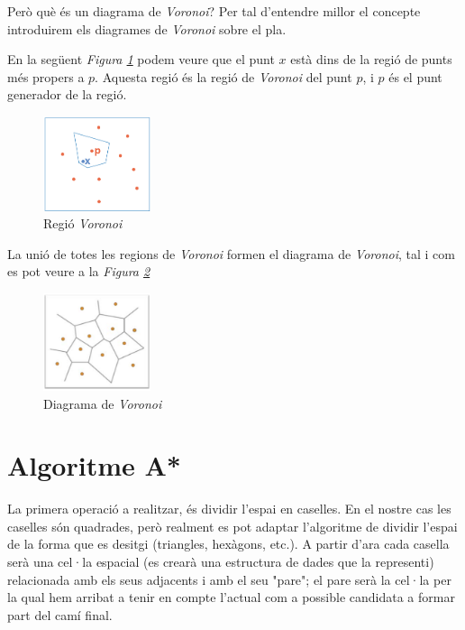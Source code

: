 \documentclass[12pt]{article}
\begin{document}
Però què és un diagrama de \textit{Voronoi}? Per tal d’entendre millor el concepte introduirem els diagrames de \textit{Voronoi} sobre el pla.

En la següent \textit{Figura \ref{fig:regio_voronoi}} podem veure que el punt $x$ està dins de la regió de punts més propers a $p$. Aquesta regió és la regió de \textit{Voronoi} del punt $p$, i $p$ és el punt generador de la regió.

\begin{figure}[H]
	\centering
	\includegraphics[width=0.28\textwidth]{imatges/regio_voronoi.png}
	\caption{Regió \textit{Voronoi}}
	\label{fig:regio_voronoi}
\end{figure}

La unió de totes les regions de \textit{Voronoi} formen el diagrama de \textit{Voronoi}, tal i com es pot veure a la \textit{Figura \ref{fig:diagrama_voronoi}}

\begin{figure}[H]
	\centering
	\includegraphics[width=0.28\textwidth]{imatges/diagrama_voronoi.png}
	\caption{Diagrama de \textit{Voronoi}}
	\label{fig:diagrama_voronoi}
\end{figure}

\clearpage
\section{Algoritme A*\label{ann:a_star}}
La primera operació a realitzar, és dividir l'espai en caselles. En el nostre cas les caselles són quadrades, però realment es pot adaptar l'algoritme de dividir l'espai de la forma que es desitgi (triangles, hexàgons, etc.). A partir d'ara cada casella serà una cel·la espacial (es crearà una estructura de dades que la representi) relacionada amb els seus adjacents i amb el seu "pare"; el pare serà la cel·la per la qual hem arribat a tenir en compte l'actual com a possible candidata a formar part del camí final.
\end{document}
